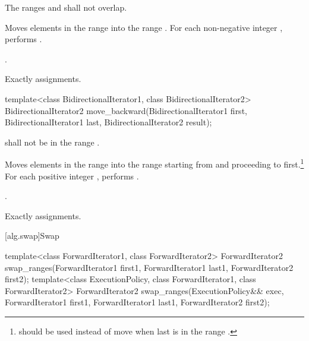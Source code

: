 \begin{itemdescr}
\pnum
\requires The ranges  and
 shall not overlap.

\pnum
\effects Moves elements in the range  into
the range .
For each non-negative integer ,
performs .

\pnum
\returns {}.

\pnum
\complexity Exactly  assignments.
\end{itemdescr}

%
\begin{itemdecl}
template<class BidirectionalIterator1, class BidirectionalIterator2>
  BidirectionalIterator2
    move_backward(BidirectionalIterator1 first,
                  BidirectionalIterator1 last,
                  BidirectionalIterator2 result);
\end{itemdecl}

\begin{itemdescr}
\pnum
\requires
{}
shall not be in the range
.

\pnum
\effects
Moves elements in the range 
into the
range 
starting from
and proceeding to first.\footnote{
should be used instead of move when last
is in
the range
.}
For each positive integer
,
performs
.

\pnum
\returns
{}.

\pnum
\complexity
Exactly
assignments.
\end{itemdescr}

[alg.swap]{Swap}

%
\begin{itemdecl}
template<class ForwardIterator1, class ForwardIterator2>
  ForwardIterator2
    swap_ranges(ForwardIterator1 first1, ForwardIterator1 last1,
                ForwardIterator2 first2);
template<class ExecutionPolicy, class ForwardIterator1, class ForwardIterator2>
  ForwardIterator2
    swap_ranges(ExecutionPolicy&& exec,
                ForwardIterator1 first1, ForwardIterator1 last1,
                ForwardIterator2 first2);
\end{itemdecl}

